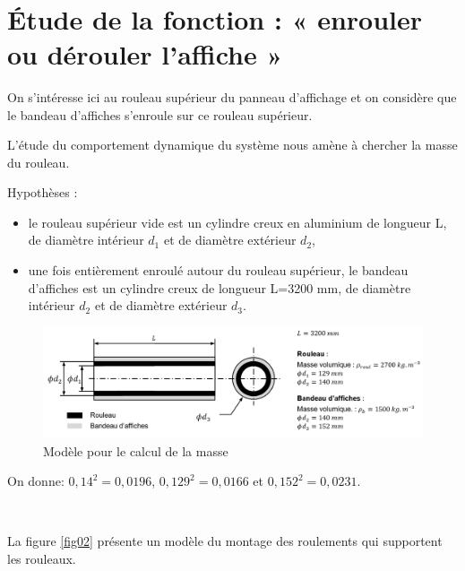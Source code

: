 ~\

\section{Étude de la fonction : « enrouler ou dérouler l'affiche »}

On s'intéresse ici au rouleau supérieur du panneau d'affichage et on considère que le bandeau d'affiches s'enroule sur ce rouleau supérieur.

L'étude du comportement dynamique du système nous amène à chercher la masse du rouleau.

Hypothèses :
\begin{itemize}
 \item le rouleau supérieur vide est un cylindre creux en aluminium de longueur L, de diamètre intérieur $d_1$  et de diamètre extérieur $d_2$,
 \item une fois entièrement enroulé autour du rouleau supérieur, le bandeau d'affiches est un cylindre creux de longueur L=3200 mm, de diamètre intérieur $d_2$ et de diamètre extérieur $d_3$.
\end{itemize}
 
\begin{figure}[!h]
\begin{center}
	\includegraphics[width=\linewidth]{img/fig01}
\end{center}
	\caption{Modèle pour le calcul de la masse}
	\label{fig01}
\end{figure}

On donne: $0,14^2=0,0196$, $0,129^2=0,0166$ et $0,152^2=0,0231$.



~\

La figure \ref{fig02} présente un modèle du montage des roulements qui supportent les rouleaux.

